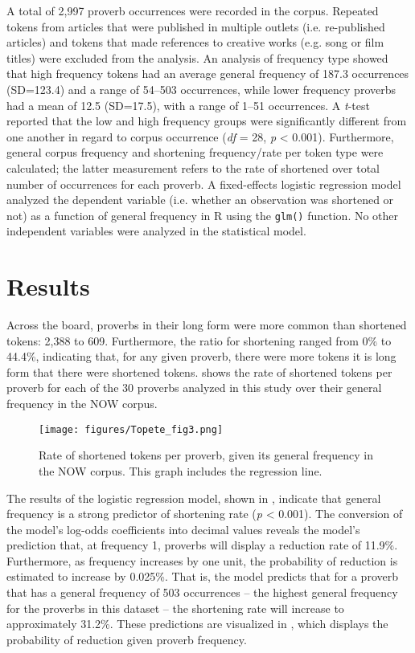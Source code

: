 \documentclass[output=paper,colorlinks,citecolor=brown,draftmode]{langscibook}
\begin{document}
A total of 2,997 proverb occurrences were recorded in the corpus. Repeated tokens from articles that were published in multiple outlets (i.e. re-published articles) and tokens that made references to creative works (e.g. song or film titles) were excluded from the analysis. An analysis of frequency type showed that high frequency tokens had an average general frequency of 187.3 occurrences (SD=123.4) and a range of 54--503 occurrences, while lower frequency proverbs had a mean of 12.5 (SD=17.5), with a range of 1--51 occurrences. A \emph{t}-test reported that the low and high frequency groups were significantly different from one another in regard to corpus occurrence (\textit{df} = 28, \textit{p} \textless{} 0.001). Furthermore, general corpus frequency and shortening frequency/rate per token type were calculated; the latter measurement refers to the rate of shortened over total number of occurrences for each proverb. A fixed-effects logistic regression model analyzed the dependent variable (i.e. whether an observation was shortened or not) as a function of general frequency in R \citep{r} using the \texttt{glm()} function. No other independent variables were analyzed in the statistical model.

\section{Results}\label{sec:results}

Across the board, proverbs in their long form were more common than shortened tokens: 2,388 to 609. Furthermore, the ratio for shortening ranged from 0\% to 44.4\%, indicating that, for any given proverb, there were more tokens it is long form that there were shortened tokens.  shows the rate of shortened tokens per proverb for each of the 30 proverbs analyzed in this study over their general frequency in the NOW corpus.

\begin{figure}
\caption{Rate of shortened tokens per proverb, given its general frequency in the NOW corpus. This graph includes the regression line.}
\label{fig:percent_short}
\texttt{[image: figures/Topete\_fig3.png]}
\end{figure}

The results of the logistic regression model, shown in , indicate that general frequency is a strong predictor of shortening rate (\textit{p} \textless{} 0.001). The conversion of the model's log-odds coefficients into decimal values reveals the model's prediction that, at frequency 1, proverbs will display a reduction rate of 11.9\%. Furthermore, as frequency increases by one unit, the probability of reduction is estimated to increase by 0.025\%. That is, the model predicts that for a proverb that has a general frequency of 503 occurrences -- the highest general frequency for the proverbs in this dataset -- the shortening rate will increase to approximately 31.2\%. These predictions are visualized in , which displays the probability of reduction given proverb frequency.
\end{document}
